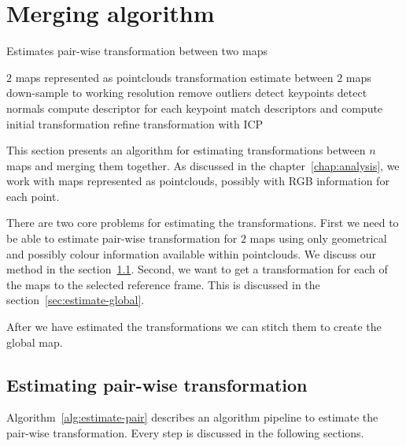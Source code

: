 \chapter{Merging algorithm}
\label{chap:mergingalgorithm}


\begin{algorithm}
    \caption[Pair-wise transformation estimation]{Estimates pair-wise transformation between two maps}
    \label{alg:estimate-pair}
    \begin{algorithmic}[1]
        \Require $2$ maps represented as pointclouds
        \Ensure transformation estimate between $2$ maps
            \State down-sample to working resolution
            \State remove outliers
            \State detect keypoints
            \State detect normals
            \State compute descriptor for each keypoint
            \State match descriptors and compute initial transformation
            \State refine transformation with \gls{ICP}
        \EndProcedure
    \end{algorithmic}
\end{algorithm}

This section presents an algorithm for estimating transformations between $n$ maps and merging them together. As discussed in the chapter~\ref{chap:analysis}, we work with maps represented as pointclouds, possibly with RGB information for each point.

There are two core problems for estimating the transformations. First we need to be able to estimate pair-wise transformation for $2$ maps using only geometrical and possibly colour information available within pointclouds. We discuss our method in the section~\ref{sec:estimate-pair-wise}. Second, we want to get a transformation for each of the maps to the selected reference frame. This is discussed in the section~\ref{sec:estimate-global}.

After we have estimated the transformations we can stitch them to create the global map.

\section{Estimating pair-wise transformation}
\label{sec:estimate-pair-wise}

Algorithm~\ref{alg:estimate-pair} describes an algorithm pipeline to estimate the pair-wise transformation. Every step is discussed in the following sections.

